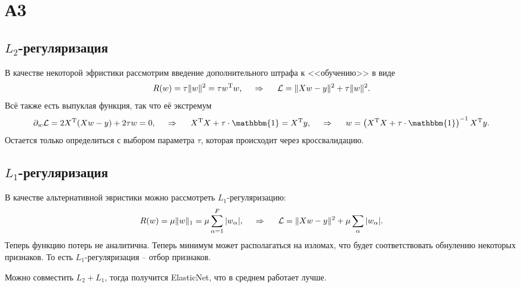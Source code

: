 \section{А3}

\subsection{\texorpdfstring{$L_2$}{L2}-регуляризация}

В качестве некоторой эфристики рассмотрим введение дополнительного штрафа к <<обучению>> в виде
\begin{equation*}
    R(w) = \tau \|w\|^2 = \tau w^{\text{T}} w,
    \hspace{0.5cm} \Rightarrow \hspace{0.5cm}
    \mathcal L = \|X w - y\|^2 + \tau \|w\|^2.
\end{equation*}
Всё также есть выпуклая функция, так что её экстремум
\begin{equation*}
    \partial_w \mathcal L = 2 X\T (X w - y) + 2 \tau w = 0,
    \hspace{0.5cm} \Rightarrow \hspace{0.5cm}
    X\T X + \tau \cdot \mathbbm{1} =  X\T y,
    \hspace{0.5cm} \Rightarrow \hspace{0.5cm}
    w = \left(X\T X + \tau \cdot \mathbbm{1}\right)^{-1} X\T y.
\end{equation*}
Остается только определиться с выбором параметра $\tau$, которая происходит через кроссвалидацию. 



\subsection{\texorpdfstring{$L_1$}{L1}-регуляризация}

 В качестве альтернативной эвристики можно рассмотреть $L_1$-регуляризацию:
 \begin{equation*}
     R(w) = \mu \|w\|_1 = \mu \sum_{\alpha=1}^{F} |w_\alpha|,
     \hspace{0.5cm} \Rightarrow \hspace{0.5cm}
     \mathcal L = \|X w - y\|^2 + \mu \sum_\alpha |w_\alpha|.
 \end{equation*}
 Теперь функцию потерь не аналитична. Теперь минимум может располагаться на изломах, что будет соответствовать обнулению некоторых признаков. То есть $L_1$-регуляризация -- отбор признаков. 

 Можно совместить $L_2 + L_1$, тогда получится ElasticNet, что в среднем работает лучше. 






